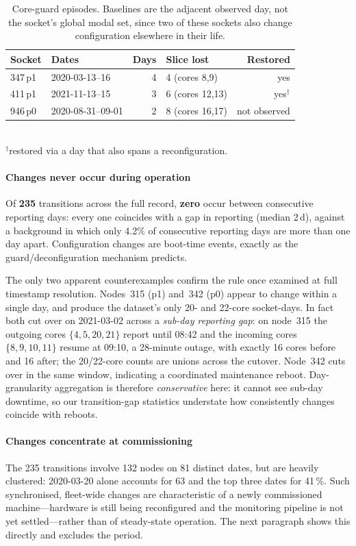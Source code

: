 \documentclass[10pt,conference]{IEEEtran}
\begin{document}
\begin{table}[h]\centering\caption{Core-guard episodes. Baselines are the adjacent observed day,
not the socket's global modal set, since two of these sockets also change configuration elsewhere
in their life.}\label{tab:guard}
\begin{tabular}{llrlr}\toprule
Socket & Dates & Days & Slice lost & Restored\\\midrule
347\,p1 & 2020-03-13--16 & 4 & 4 (cores 8,9)   & yes\\
411\,p1 & 2021-11-13--15 & 3 & 6 (cores 12,13) & yes$^\dagger$\\
946\,p0 & 2020-08-31--09-01 & 2 & 8 (cores 16,17) & not observed\\
\bottomrule\end{tabular}
\\[2pt]\footnotesize$^\dagger$restored via a day that also spans a reconfiguration.
\end{table}

\paragraph{Changes never occur during operation} Of \textbf{235} transitions across the full
record, \textbf{zero} occur between consecutive reporting days: every one coincides with a gap in
reporting (median 2\,d), against a background in which only 4.2\% of consecutive reporting days
are more than one day apart. Configuration changes
are boot-time events, exactly as the guard/deconfiguration mechanism predicts.

The only two apparent counterexamples confirm the rule once examined at full timestamp resolution.
Nodes~315 (p1) and~342 (p0) appear to change within a single day, and produce the dataset's only
20- and 22-core socket-days. In fact both cut over on 2021-03-02 across a \emph{sub-day reporting
gap}: on node~315 the outgoing cores $\{4,5,20,21\}$ report until 08:42 and the incoming cores
$\{8,9,10,11\}$ resume at 09:10, a 28-minute outage, with exactly 16 cores before and 16 after; the
20/22-core counts are unions across the cutover. Node~342 cuts over in the same window, indicating
a coordinated maintenance reboot. Day-granularity aggregation is therefore \emph{conservative}
here: it cannot see sub-day downtime, so our transition-gap statistics understate how consistently
changes coincide with reboots.

\paragraph{Changes concentrate at commissioning} The 235 transitions involve 132 nodes on 81
distinct dates, but are heavily clustered: 2020-03-20 alone accounts for 63 and the top three dates
for 41\,\%. Such synchronised, fleet-wide changes are characteristic of a newly commissioned
machine---hardware is still being reconfigured and the monitoring pipeline is not yet
settled---rather than of steady-state operation. The next paragraph shows this directly and
excludes the period.
\end{document}
